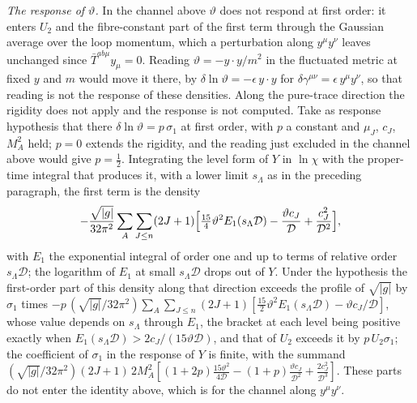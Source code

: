 \emph{The response of \(\vartheta\).} In the channel above \(\vartheta\) does not respond at first order: it enters \(U_2\) and the fibre-constant part of the first term through the Gaussian average over the loop momentum, which a perturbation along \(y^\mu y^\nu\) leaves unchanged since \(\bar T^{ab\mu}y_\mu=0\). Reading \(\vartheta=-y\cdot y/m^2\) in the fluctuated metric at fixed \(y\) and \(m\) would move it there, by \(\delta\ln\vartheta=-\epsilon\,y\cdot y\) for \(\delta\gamma^{\mu\nu}=\epsilon\,y^\mu y^\nu\), so that reading is not the response of these densities. Along the pure-trace direction the rigidity does not apply and the response is not computed. Take as response hypothesis that there \(\delta\ln\vartheta=p\,\sigma_1\) at first order, with \(p\) a constant and \(\mu_J\), \(c_J\), \(M_A^2\) held; \(p=0\) extends the rigidity, and the reading just excluded in the channel above would give \(p=\tfrac12\). Integrating the level form of \(Y\) in \(\ln\chi\) with the proper-time integral that produces it, with a lower limit \(s_\Lambda\) as in the preceding paragraph, the first term is the density
\[
-\frac{\sqrt{|g|}}{32\pi^2}\sum_A\sum_{J\le n}(2J+1)\Bigl[\tfrac{15}{4}\vartheta^2E_1(s_\Lambda\mathcal D)-\frac{\vartheta c_J}{\mathcal D}+\frac{c_J^2}{\mathcal D^2}\Bigr],
\]
with \(E_1\) the exponential integral of order one and up to terms of relative order \(s_\Lambda\mathcal D\); the logarithm of \(E_1\) at small \(s_\Lambda\mathcal D\) drops out of \(Y\). Under the hypothesis the first-order part of this density along that direction exceeds the profile of \(\sqrt{|g|}\) by \(\sigma_1\) times \(-p\,(\sqrt{|g|}/32\pi^2)\sum_A\sum_{J\le n}(2J+1)[\tfrac{15}{2}\vartheta^2E_1(s_\Lambda\mathcal D)-\vartheta c_J/\mathcal D]\), whose value depends on \(s_\Lambda\) through \(E_1\), the bracket at each level being positive exactly when \(E_1(s_\Lambda\mathcal D)>2c_J/(15\vartheta\mathcal D)\), and that of \(U_2\) exceeds it by \(p\,U_2\sigma_1\); the coefficient of \(\sigma_1\) in the response of \(Y\) is finite, with the summand \((\sqrt{|g|}/32\pi^2)(2J+1)\,2M_A^2[(1+2p)\tfrac{15\vartheta^2}{4\mathcal D}-(1+p)\tfrac{\vartheta c_J}{\mathcal D^2}+\tfrac{2c_J^2}{\mathcal D^3}]\). These parts do not enter the identity above, which is for the channel along \(y^\mu y^\nu\).

